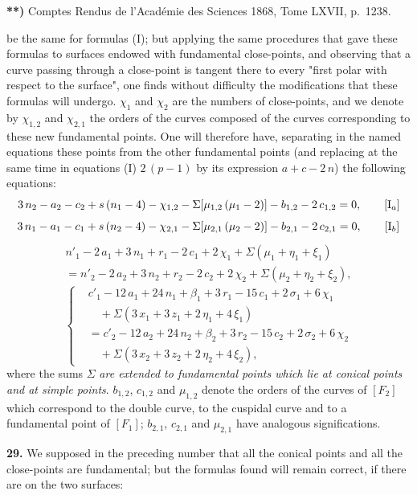 \documentclass{article}
\begin{document}
\textbf{**)} Comptes Rendus de l'Académie des Sciences 1868, Tome LXVII, p.~1238.

be the same for formulas (I); but applying the same procedures that gave these formulas to surfaces endowed with fundamental close-points, and observing that a curve passing through a close-point is tangent there to every "first polar with respect to the surface", one finds without difficulty the modifications that these formulas will undergo. $\chi_1$ and $\chi_2$ are the numbers of close-points, and we denote by $\chi_{1, 2}$ and $\chi_{2, 1}$ the orders of the curves composed of the curves corresponding to these new fundamental points. One will therefore have, separating in the named equations these points from the other fundamental points (and replacing at the same time in equations (I) $2\,(p - 1)$ by its expression $a + c - 2\,n$) the following equations:
\[
3\,n_2 - a_2 - c_2 + s\,(n_1 - 4) - \chi_{1, 2} - \Sigma[\mu_{1, 2}\,(\mu_1 - 2)] - b_{1, 2} - 2\,c_{1, 2} = 0, \tag*{[$\mathrm{I}_a$]}
\]
\[
3\,n_1 - a_1 - c_1 + s\,(n_2 - 4) - \chi_{2, 1} - \Sigma[\mu_{2, 1}\,(\mu_2 - 2)] - b_{2, 1} - 2\,c_{2, 1} = 0, \tag*{[$\mathrm{I}_b$]}
\]
\[
\begin{aligned}
n'_1 - 2\,a_1 + 3\,n_1 + r_1 - 2\,c_1 + 2\,\chi_1 + \Sigma(\mu_1 + \eta_1 + \xi_1) \\
= n'_2 - 2\,a_2 + 3\,n_2 + r_2 - 2\,c_2 + 2\,\chi_2 + \Sigma(\mu_2 + \eta_2 + \xi_2),
\end{aligned} \tag*{[II]}
\]
\[
\left\{
\begin{aligned}
& c'_1 - 12\,a_1 + 24\,n_1 + \beta_1 + 3\,r_1 - 15\,c_1 + 2\,\sigma_1 + 6\,\chi_1 \\
&\quad + \Sigma(3\,x_1 + 3\,z_1 + 2\,\eta_1 + 4\,\xi_1) \\
&= c'_2 - 12\,a_2 + 24\,n_2 + \beta_2 + 3\,r_2 - 15\,c_2 + 2\,\sigma_2 + 6\,\chi_2 \\
&\quad + \Sigma(3\,x_2 + 3\,z_2 + 2\,\eta_2 + 4\,\xi_2),
\end{aligned}
\right. \tag*{[III]}
\]
where the sums $\Sigma$ \emph{are extended to fundamental points which lie at conical points and at simple points}. $b_{1, 2}$, $c_{1, 2}$ and $\mu_{1, 2}$ denote the orders of the curves of $[F_2]$ which correspond to the double curve, to the cuspidal curve and to a fundamental point of $[F_1]$; $b_{2, 1}$, $c_{2, 1}$ and $\mu_{2, 1}$ have analogous significations.

\textbf{29.} We supposed in the preceding number that all the conical points and all the close-points are fundamental; but the formulas found will remain correct, if there are on the two surfaces:
\end{document}
